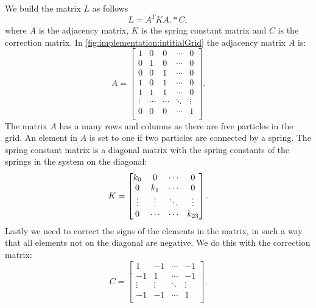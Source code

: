 	We build the matrix $L$ as follows
	\begin{equation}\label{eq:implementation:LHS}
		L = A^T K A .* C,
	\end{equation}
	where $A$ is the adjacency matrix, $K$ is the spring constant matrix and $C$ is the correction matrix. In \cref{fig:implementation:intitialGrid} the adjacency matrix $A$ is:
	\begin{equation}\label{eq:implementation:adjacency}
		A = \begin{bmatrix}
			1 		& 0 		& 0 		& \cdots 	& 0\\
			0 		& 1 		& 0 		& \cdots 	& 0\\
			0 		& 0 		& 1 		& \cdots 	& 0\\
			1 		& 0 		& 1 		& \cdots 	& 0\\
			1 		& 1 		& 1 		& \cdots 	& 0\\
			\vdots	& \cdots 	& \cdots 	& \ddots 	& \vdots\\
			0 		& 0 		& 0 		& \cdots 	& 1\\
		\end{bmatrix}.
	\end{equation}
	The matrix $A$ has a many rows and columns as there are free particles in the grid. An element in $A$ is set to one if two particles are connected by a spring. 
	The spring constant matrix is a diagonal matrix with the spring constants of the springs in the system on the diagonal:
	\begin{equation}\label{eq:implementation:springConstantMatrix}
		K = \begin{bmatrix}
			k_{0} 	& 0 			& \cdots & 0\\
			0 			& k_{1}	& \cdots & 0\\	
			\vdots 		& \vdots		& \ddots & \vdots\\
			0 			& \cdots		& \cdots & k_{23}\\
		\end{bmatrix}.
	\end{equation}	
	Lastly we need to correct the signs of the elements in the matrix, in such a way that all elements not on the diagonal are negative. We do this with the correction matrix:
	\begin{equation}\label{eq:implementation:correctionMatrix}
		C = \begin{bmatrix}
			1 			& -1 			& \cdots & -1\\
			-1 			& 1				& \cdots & -1\\	
			\vdots 		& \vdots		& \ddots & \vdots\\
			-1 			& -1			& \cdots & 1\\		
		\end{bmatrix}.
	\end{equation}

